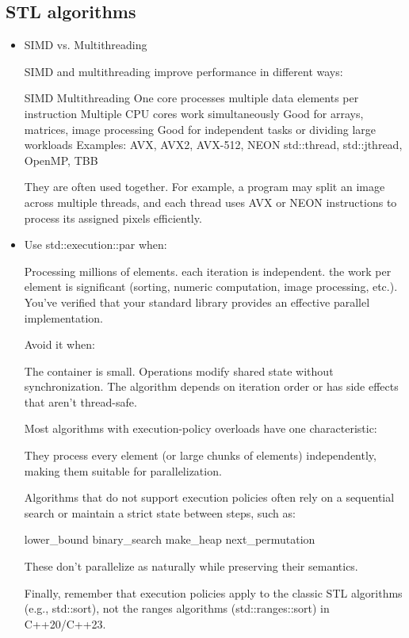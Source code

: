 \documentclass[a4paper,11pt,twoside]{book}
\begin{document}
\subsection{STL algorithms}
\begin{itemize}

	\item SIMD vs. Multithreading
	
	SIMD and multithreading improve performance in different ways:
	
	SIMD	Multithreading
	One core processes multiple data elements per instruction	Multiple CPU cores work simultaneously
	Good for arrays, matrices, image processing	Good for independent tasks or dividing large workloads
	Examples: AVX, AVX2, AVX-512, NEON	std::thread, std::jthread, OpenMP, TBB
	
	They are often used together. For example, a program may split an image across multiple threads, and each thread uses AVX or NEON instructions to process its assigned pixels efficiently.

	\item Use std::execution::par when:
	
	Processing millions of elements.
	each iteration is independent.
	the work per element is significant (sorting, numeric computation, image processing, etc.).
	You've verified that your standard library provides an effective parallel implementation.
	
	Avoid it when:
	
	The container is small.
	Operations modify shared state without synchronization.
	The algorithm depends on iteration order or has side effects that aren't thread-safe.
	
	Most algorithms with execution-policy overloads have one characteristic:
	
	They process every element (or large chunks of elements) independently, making them suitable for parallelization.
	
	Algorithms that do not support execution policies often rely on a sequential search or maintain a strict state between steps, such as:
	
	lower\_bound
	binary\_search
	make\_heap
	next\_permutation
	
	These don't parallelize as naturally while preserving their semantics.
	
	Finally, remember that execution policies apply to the classic STL algorithms (e.g., std::sort), not the ranges algorithms (std::ranges::sort) in C++20/C++23.


\end{itemize}
\end{document}
